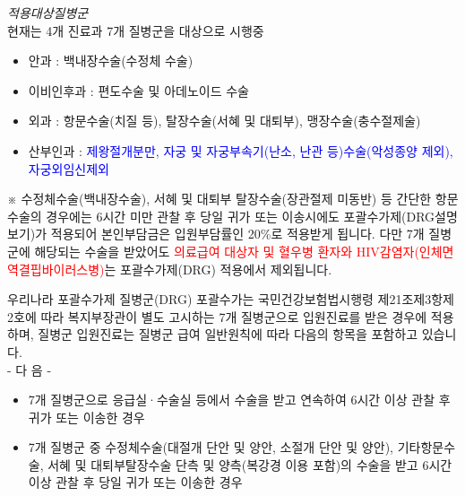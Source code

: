 \emph{적용대상질병군}\\ 
현재는 4개 진료과 7개 질병군을 대상으로 시행중
\begin{itemize}\tightlist
\item 안과 : 백내장수술(수정체 수술) 
\item 이비인후과 : 편도수술 및 아데노이드 수술 
\item 외과 : 항문수술(치질 등), 탈장수술(서혜 및 대퇴부), 맹장수술(충수절제술) 
\item 산부인과 : \textcolor{blue}{제왕절개분만, 자궁 및 자궁부속기(난소, 난관 등)수술(악성종양 제외), 자궁외임신제외}
\end{itemize}
※ 수정체수술(백내장수술), 서혜 및 대퇴부 탈장수술(장관절제 미동반) 등 간단한 항문수술의 경우에는 6시간 미만 관찰 후 당일 귀가 또는 이송시에도 포괄수가제(DRG설명보기)가 적용되어 본인부담금은 입원부담률인 20\%로 적용받게 됩니다. 다만 7개 질병군에 해당되는 수술을 받았어도 \textcolor{red}{의료급여 대상자 및 혈우병 환자와 HIV감염자(인체면역결핍바이러스병)}는 포괄수가제(DRG) 적용에서 제외됩니다.

\begin{Cdoing}{우리나라 포괄수가제}
질병군(DRG) 포괄수가는 국민건강보험법시행령 제21조제3항제2호에 따라 복지부장관이 별도 고시하는 7개 질병군으로 입원진료를 받은 경우에 적용하며, 질병군 입원진료는 질병군 급여 일반원칙에 따라 다음의 항목을 포함하고 있습니다.\\
- 다 음 -
\begin{itemize}\tightlist
\item 7개 질병군으로 응급실·수술실 등에서 수술을 받고 연속하여 6시간 이상 관찰 후 귀가 또는 이송한 경우 
\item 7개 질병군 중 수정체수술(대절개 단안 및 양안, 소절개 단안 및 양안), 기타항문수술, 서혜 및 대퇴부탈장수술 단측 및 양측(복강경 이용 포함)의 수술을 받고 6시간 이상 관찰 후 당일 귀가 또는 이송한 경우
\end{itemize}
\end{Cdoing}

